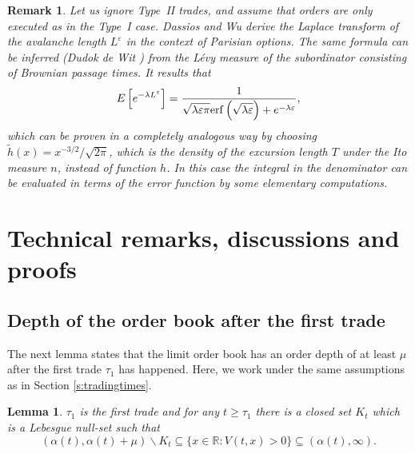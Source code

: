 \documentclass[11pt]{scrartcl}
\newtheorem{lemma}[theorem]{Lemma}
\newtheorem{remark}[theorem]{Remark}
\begin{document}
\begin{remark}
Let us ignore Type~{II} trades, and assume that orders are only executed as
in the Type~{I} case. Dassios and Wu \cite{DW} derive the Laplace transform
of the avalanche length $L^{\varepsilon }$ in the context of Parisian
options. The same formula can be inferred (Dudok de Wit \cite{DDW}) from the
L\'{e}vy measure of the subordinator consisting of Brownian passage times.
It results that
\begin{equation}
E\left[ e^{-\lambda L^{\varepsilon }}\right] =\frac{1}{\sqrt{\lambda
\varepsilon \pi }\mathrm{\func{erf}}\left( \sqrt{\lambda \varepsilon }\right) +e^{-\lambda \varepsilon }},  \label{Laurent}
\end{equation}
which can be proven in a completely analogous way by 
choosing $\tilde{h}\left( x\right) =x^{-3/2}/\sqrt{2\pi }$, which is the density
of the excursion length $T$ under the Ito measure $n$, instead of function $h$. In this
case the integral in the denominator can be evaluated in terms of the error
function by some elementary computations.
\end{remark}


\section{Technical remarks, discussions and proofs}

\subsection{Depth of the order book after the first trade}

The next lemma states that the limit order book has an order depth of at
least $\mu$ after the first trade $\tau_1$ has happened. Here, we work under
the same assumptions as in Section \ref{s:tradingtimes}.

\begin{lemma}
\label{l:depths of lob} $\tau_1$ is the first trade and for any $t\geq
\tau_1 $ there is a closed set $K_t$ which is a Lebesgue null-set such that 
\begin{equation*}
(\alpha(t),\alpha(t)+\mu)\backslash K_t \subseteq \{x\in\mathbb{R}:
V(t,x)>0\} \subseteq (\alpha(t),\infty).
\end{equation*}
\end{lemma}
\end{document}
